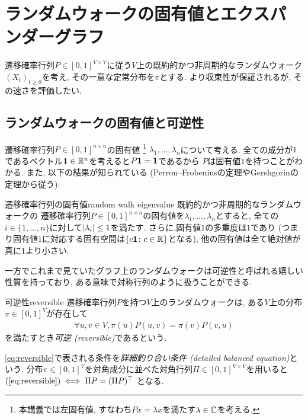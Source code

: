 \chapter{ランダムウォークの固有値とエクスパンダーグラフ}
遷移確率行列$P \in [0,1]^{V \times V}$に従う$V$上の既約的かつ非周期的なランダムウォーク$(X_t)_{t\ge 0}$を考え,
その一意な定常分布を$\pi$とする.
より収束性が保証されるが, その速さを評価したい.

\section{ランダムウォークの固有値と可逆性}
遷移確率行列$P \in [0,1]^{n \times n}$の固有値
\footnote{本講義では左固有値, すなわち$Px=\lambda x$を満たす$\lambda\in \mathbb{C}$を考える.}
$\lambda_1,\dots,\lambda_n$について考える.
全ての成分が$1$であるベクトル$\mathbf{1}\in \mathbb{R}^n$を考えると$P\mathbf{1} = \mathbf{1}$であるから
$P$は固有値$1$を持つことがわかる.
また, 以下の結果が知られている (Perron--Frobeniusの定理やGershgorinの定理から従う):
\begin{proposition}{遷移確率行列の固有値}{random walk eigenvalue}
    既約的かつ非周期的なランダムウォークの
    遷移確率行列$P\in [0,1]^{n\times n}$の固有値を$\lambda_1,\dots,\lambda_n$とすると,
    全ての$i\in\{1,\dots,n\}$に対して$\lvert\lambda_i\rvert \le 1$を満たす.
    さらに,固有値$1$の多重度は$1$であり (つまり固有値$1$に対応する固有空間は$\{c\mathbf{1} \colon c \in \mathbb{R}\}$となる), 他の固有値は全て絶対値が真に$1$より小さい.
\end{proposition}
%

一方でこれまで見ていたグラフ上のランダムウォークは可逆性と呼ばれる嬉しい性質を持っており,
ある意味で対称行列のように扱うことができる.
\begin{definition}{可逆性}{reversible}
    遷移確率行列$P$を持つ$V$上のランダムウォークは,
    ある$V$上の分布$\pi \in [0,1]^V$が存在して
    \begin{align}
        \forall u,v\in V,\pi(u) P(u,v) = \pi(v) P(v,u) \label{eq:reversible}
    \end{align}
    を満たすとき\emph{可逆 (reversible)}であるという.
\end{definition}
\cref{eq:reversible}で表される条件を\emph{詳細釣り合い条件 (detailed balanced equation)}という.
分布$\pi\in [0,1]^V$を対角成分に並べた対角行列$\Pi\in[0,1]^{V\times V}$を用いると
$(\ref{eq:reversible}) \iff \Pi P = (\Pi P)^{\top}$
となる.

